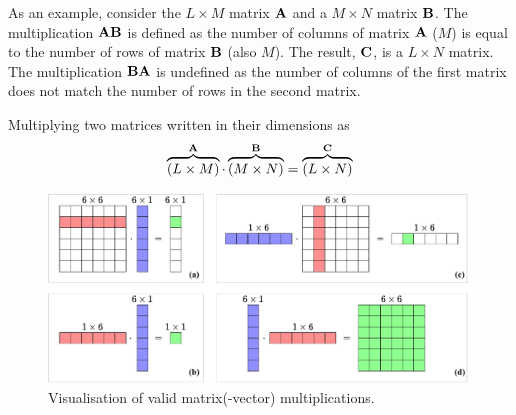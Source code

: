 As an example, consider the $L
\times M$ matrix $
\mathbf{A}$ and a $M\times N$ matrix $
\mathbf{B}$. The multiplication $\mathbf{A}\mathbf{B}$ is defined as the number of columns of matrix $
\mathbf{A}$ ($M$) is equal to the number of rows of matrix $\mathbf{B}$ (also $M$). The result, $\mathbf{C}$, is a $L \times N$ matrix. The multiplication $\mathbf{B}\mathbf{A}$ is undefined as the number of columns of the first matrix does not match the number of rows in the second matrix. 

Multiplying two matrices written in their dimensions as 
\begin{equation}
    \overbrace{(L\times M)}^{\mathbf{A}}\cdot \overbrace{(M\times N)}^{\mathbf{B}} = \overbrace{(L
    \times N)}^{\mathbf{C}}
\end{equation}
 
\begin{figure}[h]
    \includegraphics[width=\textwidth]{figures/fdtd/matrixVector2.pdf}
    \caption{Visualisation of valid matrix(-vector) multiplications. \label{fig:matrixVector}}
\end{figure}

